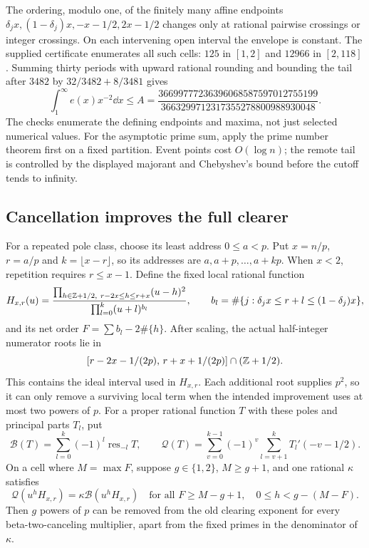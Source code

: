 The ordering, modulo one, of the finitely many affine endpoints
$\delta_jx,(1-\delta_j)x,-x-1/2,2x-1/2$ changes only at rational
pairwise crossings or integer crossings. On each intervening open
interval the envelope is constant. The supplied certificate enumerates
all such cells: $125$ in $[1,2]$ and $12966$ in $[2,118]$.
Summing thirty periods with upward rational rounding and bounding the
tail after $3482$ by $32/3482+8/3481$ gives
\begin{equation}\label{eq:arithA}
 \int_1^\infty e(x)x^{-2}\dd x\leq
 A=\frac{36699777236396068587597012755199}
         {3663299712317355278800988930048}.
\end{equation}
The checks enumerate the defining endpoints and maxima, not just
selected numerical values. For the asymptotic prime sum, apply the
prime number theorem first on a fixed partition. Event points cost
$O(\log n)$; the remote tail is controlled by the displayed majorant
and Chebyshev's bound before the cutoff tends to infinity.

\subsection{Cancellation improves the full clearer}
For a repeated pole class, choose its least address $0\leq a<p$.
Put $x=n/p$, $r=a/p$ and $k=\lfloor x-r\rfloor$, so its addresses
are $a,a+p,\ldots,a+kp$. When $x<2$, repetition requires $r\leq x-1$.
Define the fixed local rational function
\[
 H_{x,r}(u)=\frac{\prod_{h\in\mathbb Z+1/2,\ r-2x\leq h\leq r+x}(u-h)^2}
 {\prod_{l=0}^k(u+l)^{b_l}},\qquad
 b_l=\#\{j:\delta_jx\leq r+l\leq(1-\delta_j)x\},
\]
and its net order $F=\sum b_l-2\#\{h\}$. After scaling, the actual
half-integer numerator roots lie in
\[
 [r-2x-1/(2p),\,r+x+1/(2p)]\cap(\mathbb Z+1/2).
\]
This contains the ideal interval used in $H_{x,r}$. Each additional
root supplies $p^2$, so it can only remove a surviving local term
when the intended improvement uses at most two powers of $p$.
For a proper rational function $T$ with these poles and principal
parts $T_l$, put
\[
 \mathcal B(T)=\sum_{l=0}^k(-1)^l\operatorname{res}_{-l}T,
 \qquad
 \mathcal Q(T)=\sum_{v=0}^{k-1}(-1)^v\sum_{l=v+1}^kT_l'(-v-1/2).
\]
On a cell where $M=\max F$, suppose $g\in\{1,2\}$, $M\geq g+1$,
and one rational $\kappa$ satisfies
\begin{equation}\label{eq:localcriterion}
 \mathcal Q(u^hH_{x,r})=\kappa\mathcal B(u^hH_{x,r})
 \quad\text{for all }F\geq M-g+1,\quad 0\leq h<g-(M-F).
\end{equation}
Then $g$ powers of $p$ can be removed from the old clearing exponent
for every beta-two-canceling multiplier, apart from the fixed primes
in the denominator of $\kappa$.

